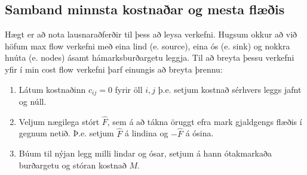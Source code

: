 \begin{lausn}

\end{lausn}








\newpage
\begin{daemi}\hspace{.1cm}

\end{daemi}



\subsection{Samband minnsta kostnaðar og mesta flæðis}
Hægt er að nota  lausnaraðferðir til þess að leysa  verkefni. Hugsum okkur að við höfum max flow verkefni með eina lind (e. source), eina ós (e. sink) og nokkra hnúta (e. nodes) ásamt hámarksburðargetu leggja. Til að breyta þessu verkefni yfir í min cost flow verkefni þarf einungis að breyta þrennu:
\begin{enumerate}
\item Látum kostnaðinn $c_{ij}=0$ fyrir öll $i,j$ þ.e. setjum kostnað sérhvers leggs jafnt og núll.
\item Veljum nægilega stórt $\hat{F}$, sem á að tákna öruggt efra mark gjaldgengs flæðis í gegnum netið. Þ.e. setjum $\hat{F}$ á lindina og $-\hat{F}$ á ósina.
\item Búum til nýjan legg milli lindar og ósar, setjum á hann ótakmarkaða burðargetu og stóran kostnað $M$.
\end{enumerate}

